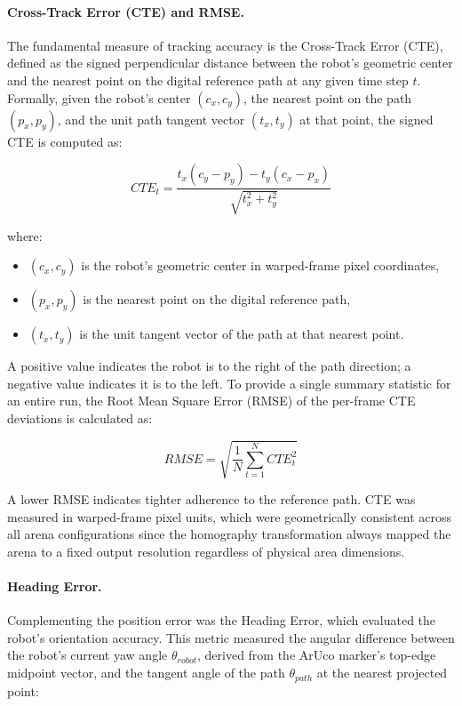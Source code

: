 \paragraph{Cross-Track Error (CTE) and RMSE.}
The fundamental measure of tracking accuracy is the Cross-Track Error (CTE), defined as
the signed perpendicular distance between the robot's geometric center and the nearest point
on the digital reference path at any given time step $t$. Formally, given the robot's center
$(c_x, c_y)$, the nearest point on the path $(p_x, p_y)$, and the unit path tangent vector
$(t_x, t_y)$ at that point, the signed CTE is computed as:

\begin{equation}
    CTE_t = \frac{t_x(c_y - p_y) - t_y(c_x - p_x)}{\sqrt{t_x^2 + t_y^2}}
    \label{eq:cte}
\end{equation}

\noindent where:
\begin{itemize}
    \item $(c_x, c_y)$ is the robot's geometric center in warped-frame pixel coordinates,
    \item $(p_x, p_y)$ is the nearest point on the digital reference path,
    \item $(t_x, t_y)$ is the unit tangent vector of the path at that nearest point.
\end{itemize}

A positive value indicates the robot is to the right of the path direction; a negative value
indicates it is to the left. To provide a single summary statistic for an entire run, the
Root Mean Square Error (RMSE) of the per-frame CTE deviations is calculated as:

\begin{equation}
    RMSE = \sqrt{\frac{1}{N} \sum_{t=1}^{N} CTE_t^2}
    \label{eq:rmse}
\end{equation}

A lower RMSE indicates tighter adherence to the reference path. CTE was measured in
warped-frame pixel units, which were geometrically consistent across all arena configurations
since the homography transformation always mapped the arena to a fixed output resolution
regardless of physical area dimensions.

\paragraph{Heading Error.}
Complementing the position error was the Heading Error, which evaluated the robot's
orientation accuracy. This metric measured the angular difference between the robot's current
yaw angle $\theta_{robot}$, derived from the ArUco marker's top-edge midpoint vector, and
the tangent angle of the path $\theta_{path}$ at the nearest projected point:

